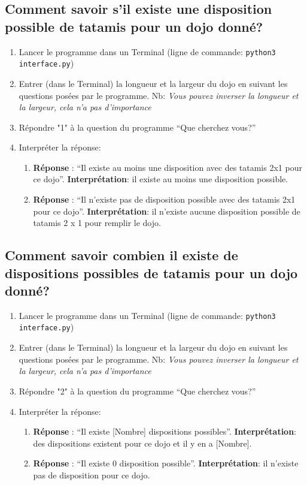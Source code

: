 \subsection{Comment savoir s’il existe une disposition possible de tatamis pour un dojo donné?}

\begin{enumerate}
    \item Lancer le programme dans un Terminal (ligne de commande: \texttt{python3 interface.py})
    \item Entrer (dans le Terminal) la longueur et la largeur du dojo en suivant les questions posées par
          le programme. Nb: \textit{Vous pouvez inverser la longueur et la largeur, cela n’a pas d’importance}
    \item Répondre "1" à la question du programme “Que cherchez vous?”
    \item Interpréter la réponse:
          \begin{enumerate}
              \item \textbf{Réponse} : “Il existe au moins une disposition avec des tatamis 2x1 pour ce dojo”.
                    \textbf{Interprétation}: il existe au moins une disposition possible.
              \item \textbf{Réponse} : “Il n'existe pas de disposition possible avec des tatamis 2x1 pour ce dojo”.
                    \textbf{Interprétation}: il n’existe aucune disposition possible de tatamis 2 x 1 pour remplir le dojo.
          \end{enumerate}
\end{enumerate}



\subsection{Comment savoir combien il existe de dispositions possibles de tatamis pour un dojo donné?}

\begin{enumerate}
    \item Lancer le programme dans un Terminal (ligne de commande: \texttt{python3 interface.py})
    \item Entrer (dans le Terminal) la longueur et la largeur du dojo en suivant les questions posées par
          le programme. Nb: \textit{Vous pouvez inverser la longueur et la largeur, cela n’a pas d’importance}
    \item Répondre "2" à la question du programme “Que cherchez vous?”
    \item Interpréter la réponse:
          \begin{enumerate}
              \item \textbf{Réponse} : “Il existe [Nombre] dispositions possibles”.
                    \textbf{Interprétation}: des dispositions existent pour ce dojo et il y en a [Nombre].
              \item \textbf{Réponse} : “Il existe 0 disposition possible”.
                    \textbf{Interprétation}: il n’existe pas de disposition pour ce dojo.
          \end{enumerate}
\end{enumerate}



